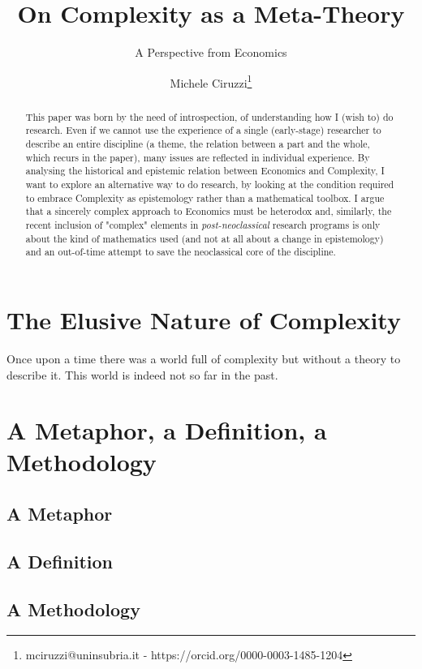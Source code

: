 \documentclass[a4paper, headings=standardclasses]{scrartcl}
\title{On Complexity as a Meta-Theory}
\subtitle{A Perspective from Economics}
\author{Michele Ciruzzi\thanks{mciruzzi@uninsubria.it - https://orcid.org/0000-0003-1485-1204}}
\begin{document}
	
	\maketitle
	
	\begin{abstract}
This paper was born by the need of introspection, of understanding how I (wish to) do research. Even if we cannot use the experience of a single (early-stage) researcher to describe an entire discipline (a theme, the relation between a part and the whole, which recurs in the paper), many issues are reflected in individual experience.
By analysing the historical and epistemic relation between Economics and Complexity, I want to explore an alternative way to do research, by looking at the condition required to embrace Complexity as epistemology rather than a mathematical toolbox. 
I argue that a sincerely complex approach to Economics must be heterodox and, similarly, the recent inclusion of "complex" elements in \textit{post-neoclassical} research programs is only about the kind of mathematics used (and not at all about a change in epistemology) and an out-of-time attempt to save the neoclassical core of the discipline.
	\end{abstract}
	
	\section{The Elusive Nature of Complexity}
Once upon a time there was a world full of complexity but without a theory to describe it. This world is indeed not so far in the past.


	
	\section{A Metaphor, a Definition, a Methodology}
	\subsection{A Metaphor}
	
	\subsection{A Definition}
	
	\subsection{A Methodology}
	
\end{document}
